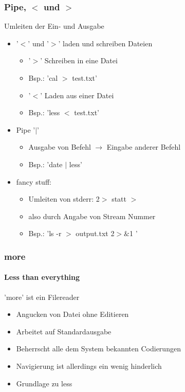 \documentclass[12pt,utf8, handout]{beamer}
\begin{document}
\begin{frame}
\frametitle{Pipe, $<$ und $>$ }
Umleiten der Ein- und Ausgabe
\begin{itemize}[<+->]
	\item '$<$' und '$>$' laden und schreiben Dateien
	\begin{itemize}[<+->]
		\item '$>$' Schreiben in eine Datei
		\item Bsp.: 'cal $>$ test.txt'
		\item '$<$' Laden aus einer Datei
		\item Bsp.: 'less $<$ test.txt'
	\end{itemize}
	\item Pipe '$\mid$'
	\begin{itemize}[<+->]
		\item Ausgabe von Befehl $\to$ Eingabe anderer Befehl
		\item Bsp.: 'date $\mid$ less'
	\end{itemize}
	\item fancy stuff:
	\begin{itemize}[<+->]
		\item Umleiten von stderr: 2$>$ statt $>$
		\item also durch Angabe von Stream Nummer
		\item Bsp.: 'ls -r $>$ output.txt 2$>\&$1 '
	\end{itemize}
\end{itemize}
\end{frame}

\begin{frame}
\frametitle{more}
\framesubtitle{\textcolor{ownDarkOr}{Less than everything}}
'more' ist ein Filereader
\begin{itemize}
	\item Angucken von Datei ohne Editieren
	\item Arbeitet auf Standardausgabe
	\item Beherrscht alle dem System bekannten Codierungen
	\item Navigierung ist allerdings ein wenig hinderlich
	\item Grundlage zu less
\end{itemize}
\end{frame}
\end{document}
